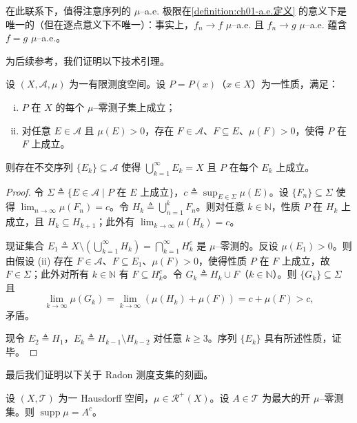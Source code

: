 \documentclass[../../main.tex]{subfiles}%
\begin{document}
在此联系下，值得注意序列的 $\mu$--a.e. 极限在\cref{definition:ch01-a.e.定义} 的意义下是唯一的（但在逐点意义下不唯一）：事实上，$f_n\to f$ $\mu$--a.e. 且 $f_n\to g$ $\mu$--a.e. 蕴含 $f=g$ $\mu$--a.e.。

为后续参考，我们证明以下技术引理。

\begin{lemma}[穷尽引理]\label{lemma:ch01-穷尽引理}
\label{lemma:ch01-穷竭}
设 $(X,\mathcal{A},\mu)$ 为一有限测度空间。设 $P=P(x)$（$x\in X$）为一性质，满足：
\begin{enumerate}[(i)]
\item $P$ 在 $X$ 的每个 $\mu$--零测子集上成立；
\item 对任意 $E\in\mathcal{A}$ 且 $\mu(E)>0$，存在 $F\in\mathcal{A}$、$F\subseteq E$、$\mu(F)>0$，使得 $P$ 在 $F$ 上成立。
\end{enumerate}
则存在不交序列 $\{E_k\}\subseteq\mathcal{A}$ 使得 $\bigcup_{k=1}^\infty E_k=X$ 且 $P$ 在每个 $E_k$ 上成立。
\end{lemma}

\begin{proof}
令 $\Sigma\triangleq \{E\in\mathcal{A}\mid P\text{ 在 }E\text{ 上成立}\}$，$c\triangleq \sup_{E\in\Sigma}\mu(E)$。设 $\{F_n\}\subseteq\Sigma$ 使得 $\lim_{n\to\infty}\mu(F_n)=c$。令 $H_k\triangleq \bigcup_{n=1}^k F_n$。则对任意 $k\in\mathbb{N}$，性质 $P$ 在 $H_k$ 上成立，且 $H_k\subseteq H_{k+1}$；此外有 $\lim_{k\to\infty}\mu(H_k)=c$。

现证集合 $E_1\triangleq X\setminus(\bigcup_{k=1}^\infty H_k)=\bigcap_{k=1}^\infty H_k^c$ 是 $\mu$--零测的。反设 $\mu(E_1)>0$。则由假设 (ii) 存在 $F\in\mathcal{A}$、$F\subseteq E_1$、$\mu(F)>0$，使得性质 $P$ 在 $F$ 上成立，故 $F\in\Sigma$；此外对所有 $k\in\mathbb{N}$ 有 $F\subseteq H_k^c$。令 $G_k\triangleq H_k\cup F$（$k\in\mathbb{N}$）。则 $\{G_k\}\subseteq\Sigma$ 且
\[
\lim_{k\to\infty}\mu(G_k)=\lim_{k\to\infty}(\mu(H_k)+\mu(F))=c+\mu(F)>c,
\]
矛盾。

现令 $E_2\triangleq H_1$，$E_k\triangleq H_{k-1}\setminus H_{k-2}$ 对任意 $k\geqslant 3$。序列 $\{E_k\}$ 具有所述性质，证毕。
\end{proof}

最后我们证明以下关于 Radon 测度支集的刻画。

\begin{lemma}\label{lemma:ch01-支集刻画}
设 $(X,\mathcal{T})$ 为一 Hausdorff 空间，$\mu\in\mathcal{R}^+(X)$。设 $A\in\mathcal{T}$ 为最大的开 $\mu$--零测集。则 $\operatorname{supp}\mu=A^c$。
\end{lemma}
\end{document}
